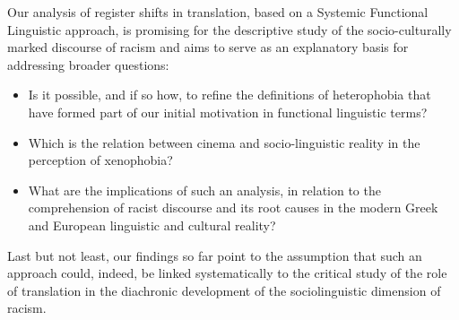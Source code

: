 \documentclass[output=paper]{LSP/langsci}
\begin{document}
Our analysis of register shifts in translation, based on a Systemic Functional Linguistic approach, is promising for the descriptive study of the socio-culturally marked discourse of racism and aims to serve as an explanatory basis for addressing broader questions:

\begin{itemize}
\item Is it possible, and if so how, to refine the definitions of heterophobia that have formed part of our initial motivation in functional linguistic terms?
\item Which is the relation between cinema and socio-linguistic reality in the perception of xenophobia?
\item What are the implications of such an analysis, in relation to the comprehension of racist discourse and its root causes in the modern Greek and European linguistic and cultural reality?
\end{itemize}

Last but not least, our findings so far point to the assumption that such an approach could, indeed, be linked systematically to the critical study of the role of translation in the diachronic development of the sociolinguistic dimension of racism.

\printbibliography[heading=subbibliography,notkeyword=this]
\end{document}

